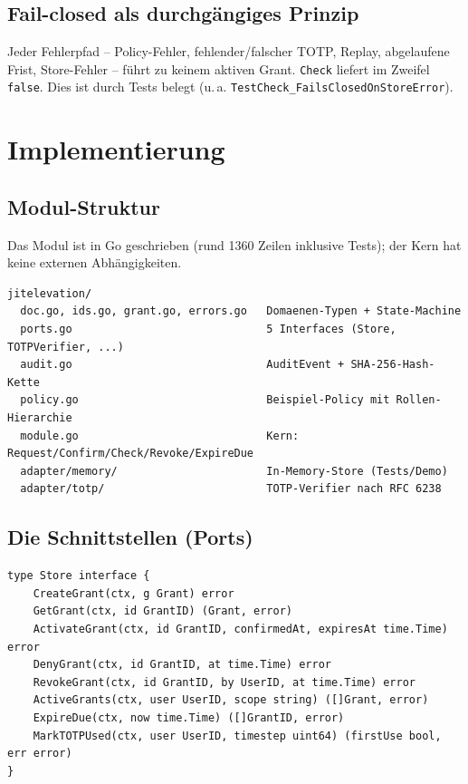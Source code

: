 \documentclass[11pt,a4paper]{article}
\begin{document}
\subsection{Fail-closed als durchgängiges Prinzip}
Jeder Fehlerpfad -- Policy-Fehler, fehlender/falscher TOTP, Replay, abgelaufene
Frist, Store-Fehler -- führt zu keinem aktiven Grant. \texttt{Check} liefert im
Zweifel \texttt{false}. Dies ist durch Tests belegt (u.\,a.
\texttt{TestCheck\_FailsClosedOnStoreError}).

\section{Implementierung}

\subsection{Modul-Struktur}
Das Modul ist in Go geschrieben (rund 1360 Zeilen inklusive Tests); der Kern hat
keine externen Abhängigkeiten.

\begin{lstlisting}[language={},numbers=none,basicstyle=\ttfamily\footnotesize]
jitelevation/
  doc.go, ids.go, grant.go, errors.go   Domaenen-Typen + State-Machine
  ports.go                              5 Interfaces (Store, TOTPVerifier, ...)
  audit.go                              AuditEvent + SHA-256-Hash-Kette
  policy.go                             Beispiel-Policy mit Rollen-Hierarchie
  module.go                             Kern: Request/Confirm/Check/Revoke/ExpireDue
  adapter/memory/                       In-Memory-Store (Tests/Demo)
  adapter/totp/                         TOTP-Verifier nach RFC 6238
\end{lstlisting}

\subsection{Die Schnittstellen (Ports)}
\begin{lstlisting}
type Store interface {
    CreateGrant(ctx, g Grant) error
    GetGrant(ctx, id GrantID) (Grant, error)
    ActivateGrant(ctx, id GrantID, confirmedAt, expiresAt time.Time) error
    DenyGrant(ctx, id GrantID, at time.Time) error
    RevokeGrant(ctx, id GrantID, by UserID, at time.Time) error
    ActiveGrants(ctx, user UserID, scope string) ([]Grant, error)
    ExpireDue(ctx, now time.Time) ([]GrantID, error)
    MarkTOTPUsed(ctx, user UserID, timestep uint64) (firstUse bool, err error)
}
\end{lstlisting}
\end{document}
